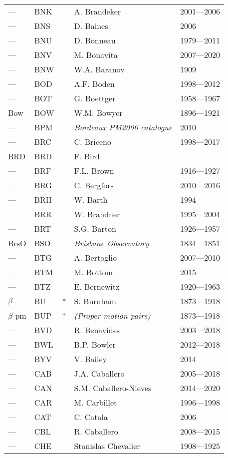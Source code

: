 \begin{longtable}{l|l|c|p{59mm}|l}
--- & BNK &   & A. Brandeker & 2001---2006 \\
--- & BNS &   & D. Baines & 2006 \\
--- & BNU &   & D. Bonneau & 1979---2011 \\
--- & BNV &   & M. Bonavita & 2007---2020 \\
--- & BNW &   & W.A. Baranov & 1909 \\
--- & BOD &   & A.F. Boden & 1998---2012 \\
--- & BOT &   & G. Boettger & 1958---1967 \\
Bow & BOW &   & W.M. Bowyer & 1896---1921 \\
--- & BPM &   & \emph{Bordeaux PM2000 catalogue} & 2010 \\
--- & BRC &   & C. Briceno & 1998---2017 \\
BRD & BRD &   & F. Bird & \\
--- & BRF &   & F.L. Brown & 1916---1927 \\
--- & BRG &   & C. Bergfors & 2010---2016 \\
--- & BRH &   & W. Barth & 1994 \\
--- & BRR &   & W. Brandner & 1995---2004 \\
--- & BRT &   & S.G. Barton & 1926---1957 \\
BrsO & BSO &   & \emph{Brisbane Observatory} & 1834---1851 \\
--- & BTG &   & A. Bertoglio & 2007---2010 \\
--- & BTM &   & M. Bottom & 2015 \\
--- & BTZ &   & E. Bernewitz & 1920---1963 \\
$\beta$ & BU  & * & S. Burnham & 1873---1918 \\
$\beta$ pm & BUP & * & \emph{(Proper motion pairs)} & 1873---1918 \\
--- & BVD &   & R. Benavides & 2003---2018 \\
--- & BWL &   & B.P. Bowler & 2012---2018 \\
--- & BYV &   & V. Bailey & 2014 \\\midrule
--- & CAB &   & J.A. Caballero & 2005---2018 \\
--- & CAN &   & S.M. Caballero-Nieves & 2014---2020 \\
--- & CAR &   & M. Carbillet & 1996---1998 \\
--- & CAT &   & C. Catala & 2006 \\
--- & CBL &   & R. Caballero & 2008---2015 \\
--- & CHE &   & Stanislas Chevalier & 1908---1925 \\

\end{longtable}
